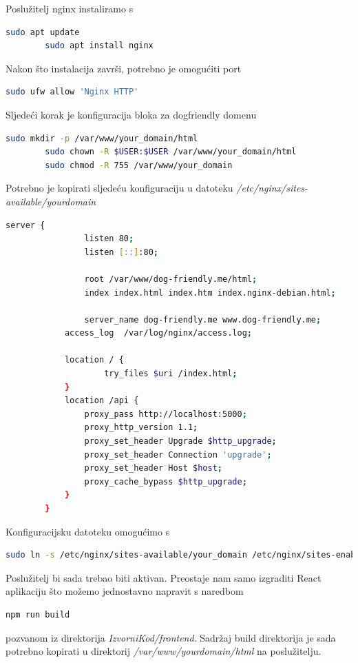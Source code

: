     Poslužitelj nginx instaliramo s
    \begin{lstlisting}[language=bash]
        sudo apt update
        sudo apt install nginx
    \end{lstlisting}
    Nakon što instalacija završi, potrebno je omogućiti port
    \begin{lstlisting}[language=bash]
        sudo ufw allow 'Nginx HTTP'
    \end{lstlisting}
    Sljedeći korak je konfiguracija bloka za dogfriendly domenu
    \begin{lstlisting}[language=bash]
        sudo mkdir -p /var/www/your_domain/html
        sudo chown -R $USER:$USER /var/www/your_domain/html
        sudo chmod -R 755 /var/www/your_domain
    \end{lstlisting}
    Potrebno je kopirati sljedeću konfiguraciju u datoteku \textit{/etc/nginx/sites-available/your\textunderscore domain}
    \begin{lstlisting}[language=bash]
        server {
                listen 80;
                listen [::]:80;
        
                root /var/www/dog-friendly.me/html;
                index index.html index.htm index.nginx-debian.html;
        
                server_name dog-friendly.me www.dog-friendly.me;
        	access_log  /var/log/nginx/access.log;
        	
        	location / {
            		try_files $uri /index.html;
        	}
        	location /api {  
          		proxy_pass http://localhost:5000;
          		proxy_http_version 1.1;
          		proxy_set_header Upgrade $http_upgrade;
          		proxy_set_header Connection 'upgrade';
          		proxy_set_header Host $host;
          		proxy_cache_bypass $http_upgrade; 
        	}
        }

    \end{lstlisting}
    Konfiguracijsku datoteku omogućimo s
    \begin{lstlisting}[language=bash]
        sudo ln -s /etc/nginx/sites-available/your_domain /etc/nginx/sites-enabled/
    \end{lstlisting}
    Poslužitelj bi sada trebao biti aktivan. Preostaje nam samo izgraditi React aplikaciju što možemo jednostavno napravit s naredbom
    \begin{lstlisting}[language=bash]
        npm run build
    \end{lstlisting}
    pozvanom iz direktorija \textit{IzvorniKod/frontend}.
    Sadržaj build direktorija je sada potrebno kopirati u direktorij \textit{/var/www/your\textunderscore domain/html} na poslužitelju.
    